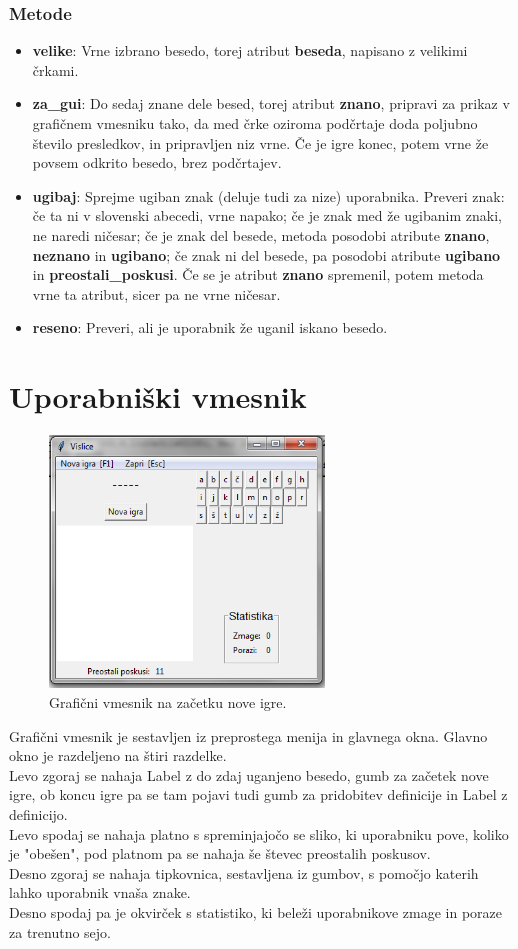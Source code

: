 \documentclass [a4paper, 12pt] {article}
\begin{document}
\subsubsection {Metode}
\begin {itemize}
\item \textbf {velike}: Vrne izbrano besedo, torej atribut \textbf {beseda}, napisano z velikimi črkami.
\item \textbf {za\_gui}: Do sedaj znane dele besed, torej atribut \textbf {znano}, pripravi za prikaz v grafičnem vmesniku tako, da med črke oziroma podčrtaje doda poljubno število presledkov, in pripravljen niz vrne. Če je igre konec, potem vrne že povsem odkrito besedo, brez podčrtajev. 
\item \textbf{ugibaj}: Sprejme ugiban znak (deluje tudi za nize) uporabnika. Preveri znak: če ta ni v slovenski abecedi, vrne napako; če je znak med že ugibanim znaki, ne naredi ničesar; če je znak del besede, metoda posodobi atribute \textbf {znano}, \textbf {neznano} in \textbf {ugibano}; če znak ni del besede, pa posodobi atribute \textbf {ugibano} in \textbf {preostali\_poskusi}. Če se je atribut \textbf {znano} spremenil, potem metoda vrne ta atribut, sicer pa ne vrne ničesar. 
\item \textbf{reseno}: Preveri, ali je uporabnik že uganil iskano besedo.
\end {itemize}

\section {Uporabniški vmesnik}
\begin {figure} [h]
\centering
\includegraphics [height=190pt] {slike/za_porocilo_gui.png}
\caption {Grafični vmesnik na začetku nove igre.}
\end {figure}
\noindent Grafični vmesnik je sestavljen iz preprostega menija in glavnega okna.  Glavno okno je razdeljeno na štiri razdelke. \\
Levo zgoraj se nahaja Label z do zdaj uganjeno besedo, gumb za začetek nove igre, ob koncu igre pa se tam pojavi tudi gumb za pridobitev definicije in Label z definicijo. \\
Levo spodaj se nahaja platno s spreminjajočo se sliko, ki uporabniku pove, koliko je "obešen", pod platnom pa se nahaja še števec preostalih poskusov.  \\
Desno zgoraj se nahaja tipkovnica, sestavljena iz gumbov, s pomočjo katerih lahko uporabnik vnaša znake. \\
Desno spodaj pa je okvirček s statistiko, ki beleži uporabnikove zmage in poraze za trenutno sejo. 
\end{document}
